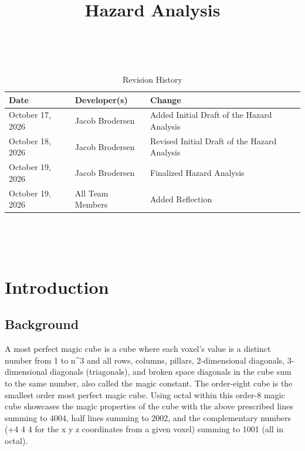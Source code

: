 \documentclass{article}
\title{Hazard Analysis\\\progname}
\author{\authname}
\date{}
\begin{document}
\maketitle
\thispagestyle{empty}

~\newpage


\begin{table}[hp]
\caption{Revision History} \label{TblRevisionHistory}
\begin{tabularx}{\textwidth}{llX}
\toprule
\textbf{Date} & \textbf{Developer(s)} & \textbf{Change}\\
\midrule
October 17, 2026 & Jacob Brodersen & Added Initial Draft of the Hazard Analysis\\
October 18, 2026 & Jacob Brodersen & Revised Initial Draft of the Hazard Analysis\\
October 19, 2026 & Jacob Brodersen & Finalized Hazard Analysis\\
October 19, 2026 & All Team Members & Added Reflection\\
\bottomrule
\end{tabularx}
\end{table}

~\newpage

\tableofcontents

~\newpage


\section{Introduction}

\subsection{Background}

A most perfect magic cube is a cube where each voxel's value is a distinct number from 1 to n\textasciicircum{}3 and all rows, columns, pillars, 2-dimensional diagonals, 3-dimensional diagonals (triagonals), and broken space diagonals in the cube sum to the same number, also called the magic constant. The order-eight cube is the smallest order most perfect magic cube. Using octal within this order-8 magic cube showcases the magic properties of the cube with the above prescribed lines summing to 4004, half lines summing to 2002, and the complementary numbers (+4 4 4 for the x y z coordinates from a given voxel) summing to 1001 (all in octal).
\end{document}

